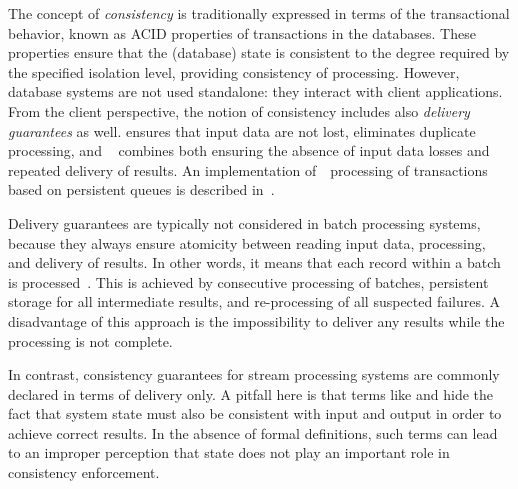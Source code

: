 \label{fs-preliminaries}

The concept of {\em consistency} is traditionally expressed in terms of the transactional behavior, known as ACID properties of transactions in the databases. 
 These properties ensure that the (database) state is consistent to the degree required by the specified isolation level, providing consistency of processing. 
 However, database systems are not used standalone: they      interact  with client applications.
  From the client perspective,   the notion of consistency includes also  {\em delivery guarantees} as well. {\em \Alo} ensures that input data are not lost, {\em \amo} eliminates duplicate processing, and {\em ~\eo} combines both ensuring the absence of input data losses and repeated delivery of results. An implementation of~\eo\ processing of transactions based on persistent queues is described in~\cite{DBLP:books/mk/WeikumV2002}.



Delivery guarantees are typically not considered in batch processing systems, because they always ensure atomicity between reading input data, processing, and delivery of results. In other words, it means that each record within a batch is processed~\eo. This is achieved by consecutive processing of batches, persistent storage for all intermediate results, and re-processing of all suspected failures. 
A disadvantage of this approach is the impossibility to deliver any results while the processing is not complete.

In contrast,   consistency guarantees   for  stream processing systems   are commonly declared in terms of delivery only. 
A pitfall here is that terms like {\em \eo} and {\em \alo} hide the fact that system state must also be consistent with input and output in order to achieve correct results. 
In the absence of formal definitions, such terms  can lead to an improper perception that state does not play an important role in consistency enforcement. 

